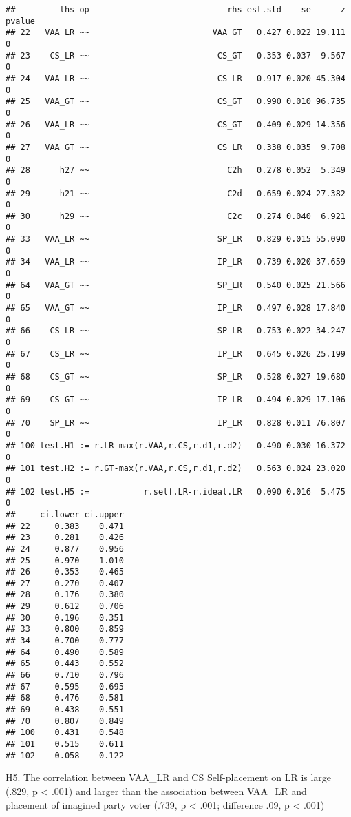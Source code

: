 \documentclass[
]{article}
\begin{document}
\begin{verbatim}
##         lhs op                            rhs est.std    se      z pvalue
## 22   VAA_LR ~~                         VAA_GT   0.427 0.022 19.111      0
## 23    CS_LR ~~                          CS_GT   0.353 0.037  9.567      0
## 24   VAA_LR ~~                          CS_LR   0.917 0.020 45.304      0
## 25   VAA_GT ~~                          CS_GT   0.990 0.010 96.735      0
## 26   VAA_LR ~~                          CS_GT   0.409 0.029 14.356      0
## 27   VAA_GT ~~                          CS_LR   0.338 0.035  9.708      0
## 28      h27 ~~                            C2h   0.278 0.052  5.349      0
## 29      h21 ~~                            C2d   0.659 0.024 27.382      0
## 30      h29 ~~                            C2c   0.274 0.040  6.921      0
## 33   VAA_LR ~~                          SP_LR   0.829 0.015 55.090      0
## 34   VAA_LR ~~                          IP_LR   0.739 0.020 37.659      0
## 64   VAA_GT ~~                          SP_LR   0.540 0.025 21.566      0
## 65   VAA_GT ~~                          IP_LR   0.497 0.028 17.840      0
## 66    CS_LR ~~                          SP_LR   0.753 0.022 34.247      0
## 67    CS_LR ~~                          IP_LR   0.645 0.026 25.199      0
## 68    CS_GT ~~                          SP_LR   0.528 0.027 19.680      0
## 69    CS_GT ~~                          IP_LR   0.494 0.029 17.106      0
## 70    SP_LR ~~                          IP_LR   0.828 0.011 76.807      0
## 100 test.H1 := r.LR-max(r.VAA,r.CS,r.d1,r.d2)   0.490 0.030 16.372      0
## 101 test.H2 := r.GT-max(r.VAA,r.CS,r.d1,r.d2)   0.563 0.024 23.020      0
## 102 test.H5 :=           r.self.LR-r.ideal.LR   0.090 0.016  5.475      0
##     ci.lower ci.upper
## 22     0.383    0.471
## 23     0.281    0.426
## 24     0.877    0.956
## 25     0.970    1.010
## 26     0.353    0.465
## 27     0.270    0.407
## 28     0.176    0.380
## 29     0.612    0.706
## 30     0.196    0.351
## 33     0.800    0.859
## 34     0.700    0.777
## 64     0.490    0.589
## 65     0.443    0.552
## 66     0.710    0.796
## 67     0.595    0.695
## 68     0.476    0.581
## 69     0.438    0.551
## 70     0.807    0.849
## 100    0.431    0.548
## 101    0.515    0.611
## 102    0.058    0.122
\end{verbatim}

H5. The correlation between VAA\_LR and CS Self-placement on LR is large
(.829, p \textless{} .001) and larger than the association between
VAA\_LR and placement of imagined party voter (.739, p \textless{} .001;
difference .09, p \textless{} .001)
\end{document}
